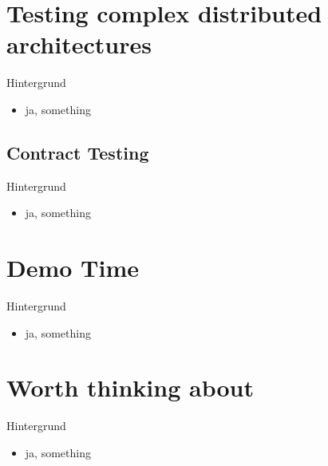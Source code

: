 

	
\section{Testing complex distributed architectures}
\begin{frame}{Hintergrund}

\begin{itemize}
\item ja, something
\end{itemize}

\end{frame}


\subsection{Contract Testing}
\begin{frame}{Hintergrund}

\begin{itemize}
\item ja, something
\end{itemize}

\end{frame}



\section{Demo Time}
\begin{frame}{Hintergrund}

\begin{itemize}
\item ja, something
\end{itemize}

\end{frame}


\section{Worth thinking about}
\begin{frame}{Hintergrund}

\begin{itemize}
\item ja, something
\end{itemize}

\end{frame}
